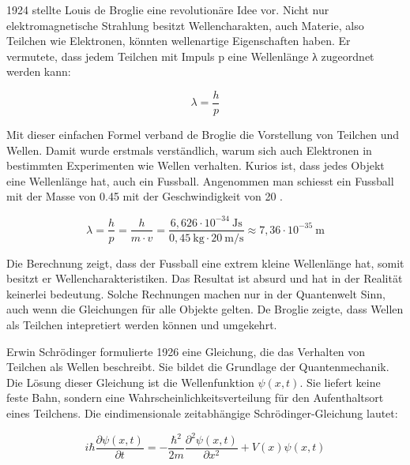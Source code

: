 	
	1924 stellte Louis de Broglie eine revolutionäre Idee vor.
	Nicht nur elektromagnetische Strahlung besitzt Wellencharakten, auch Materie, also Teilchen wie Elektronen, könnten wellenartige Eigenschaften haben.
	Er vermutete, dass jedem Teilchen mit Impuls p eine Wellenlänge λ zugeordnet werden kann:
	
	\begin{equation}
		\lambda = \frac{h}{p}
	\end{equation}	
	
	Mit dieser einfachen Formel verband de Broglie die Vorstellung von Teilchen und Wellen. Damit wurde erstmals verständlich, warum sich auch Elektronen in bestimmten Experimenten wie Wellen verhalten.
	Kurios ist, dass jedes Objekt eine Wellenlänge hat, auch ein Fussball.
	Angenommen man schiesst ein Fussball mit der Masse von 0.45  mit der Geschwindigkeit von 20 .
	
	\begin{equation}
		\lambda = \frac{h}{p} = \frac{h}{m \cdot v} = 	\frac{6{,}626 \cdot 10^{-34} \ \text{Js}}{0{,}45 \ \text{kg} \cdot 20 \ \text{m/s}} \approx 7{,}36 \cdot 10^{-35} \ \text{m}
	\end{equation}	
	
	Die Berechnung zeigt, dass der Fussball eine extrem kleine Wellenlänge hat, somit besitzt er Wellencharakteristiken.
	Das Resultat ist absurd und hat in der Realität keinerlei bedeutung.
	Solche Rechnungen machen nur in der Quantenwelt Sinn, auch wenn die Gleichungen für alle Objekte gelten. 
	De Broglie zeigte, dass Wellen als Teilchen intepretiert werden können und umgekehrt. 
	
	
	
	Erwin Schrödinger formulierte 1926 eine Gleichung, die das Verhalten von Teilchen als Wellen beschreibt. 
	Sie bildet die Grundlage der Quantenmechanik. Die Lösung dieser Gleichung ist die Wellenfunktion \( \psi(x, t) \). Sie liefert keine feste Bahn, sondern eine Wahrscheinlichkeitsverteilung für den Aufenthaltsort eines Teilchens.
	Die eindimensionale zeitabhängige Schrödinger-Gleichung lautet:
	
	\begin{equation}\label{fourier:equation:zeitabhaengigeSchroedingerGleichung}
		i \hbar \frac{\partial \psi(x,t)}{\partial t} = -\frac{\hbar^2}{2m} \frac{\partial^2 \psi(x,t)}{\partial x^2} + V(x) \psi(x,t)
	\end{equation}
	
